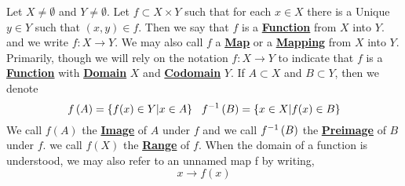 \newcommand{\Function}[0]{\textbf{\hyperref[def:Function]{Function}}\xspace}
\newcommand{\Functions}[0]{\textbf{\hyperref[def:Function]{Functions}}\xspace}
\newcommand{\Map}[0]{\textbf{\hyperref[def:Function]{Map}}\xspace}
\newcommand{\Maps}[0]{\textbf{\hyperref[def:Function]{Maps}}\xspace}
\newcommand{\Mapping}[0]{\textbf{\hyperref[def:Function]{Mapping}}\xspace}
\newcommand{\Mappings}[0]{\textbf{\hyperref[def:Function]{Mappings}}\xspace}
\newcommand{\FunctionDomain}[0]{\textbf{\hyperref[def:Function]{Domain}}\xspace}
\newcommand{\FunctionDomains}[0]{\textbf{\hyperref[def:Function]{Domains}}\xspace}
\newcommand{\FunctionCodomain}[0]{\textbf{\hyperref[def:Function]{Codomain}}\xspace}
\newcommand{\FunctionCodomains}[0]{\textbf{\hyperref[def:Function]{Codomains}}\xspace}
\newcommand{\FunctionRange}[0]{\textbf{\hyperref[def:Function]{Range}}\xspace}
\newcommand{\FunctionRanges}[0]{\textbf{\hyperref[def:Function]{Ranges}}\xspace}
\newcommand{\FunctionImage}[0]{\textbf{\hyperref[def:Function]{Image}}\xspace}
\newcommand{\FunctionImages}[0]{\textbf{\hyperref[def:Function]{Images}}\xspace}
\newcommand{\FunctionPreimage}[0]{\textbf{\hyperref[def:Function]{Preimage}}\xspace}
\newcommand{\FunctionPreimages}[0]{\textbf{\hyperref[def:Function]{Preimages}}\xspace}
\begin{df}[Function]
\label{def:Function}

\rm
    Let $X \neq \emptyset$ 
    and $Y \neq \emptyset$.
    Let $f \subset X \times Y$ 
    such that for each $x \in X$ 
    there is a Unique $y \in Y$ 
    such that 
    $(x,y) \in f$. 
    Then we say that $f$ 
    is a \Function
    from $X$ into $Y$. 
    and we write 
    $f:X \to Y$. 
    We may also call $f$ 
    a 
    \Map
    or a 
    \Mapping 
    from $X$ 
    into $Y$. 
    Primarily, though 
    we will rely on the notation 
    $f:X \to Y$ to indicate
    that 
    $f$ is a 
    \Function
    with 
    \FunctionDomain
    $X$
    and 
    \FunctionCodomain
    $Y$.
    If $A \subset X$ 
    and $B \subset Y$, 
    then we denote 
    \begin{equation*}
    f\left( A\right)= \{f(x)\in Y | x \in A\} \\
    \; \; \;
    f^{-1}\left( B\right) = \{x \in X | f(x) \in B \}
    \end{equation*}
    We call 
    $f(A)$ 
    the \FunctionImage
    of $A$ under $f$
    and we call
    $f^{-1}\left( B\right)$ 
    the 
    \FunctionPreimage
    of $B$ under
    $f$. 
    we call $f(X)$ 
    the \FunctionRange
    of $f$. 
    When the domain of a function is understood, we may also refer to an unnamed map
    f by writing, 
    \begin{equation*}
    x \to f(x)
    \end{equation*}
\end{df}
